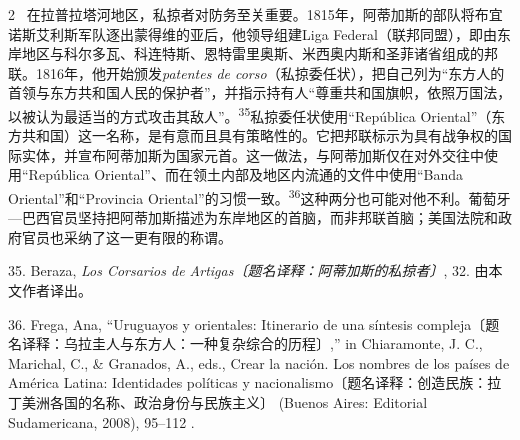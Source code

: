 \documentclass[10pt,a4paper]{article}
\begin{document}
\begin{paracol}{2}
\switchcolumn*
{\scriptsize\color{gray} [p. 9]}\ 在拉普拉塔河地区，私掠者对防务至关重要。1815年，阿蒂加斯的部队将布宜诺斯艾利斯军队逐出蒙得维的亚后，他领导组建Liga Federal（联邦同盟），即由东岸地区与科尔多瓦、科连特斯、恩特雷里奥斯、米西奥内斯和圣菲诸省组成的邦联。1816年，他开始颁发\textit{patentes de corso}（私掠委任状），把自己列为“东方人的首领与东方共和国人民的保护者”，并指示持有人“尊重共和国旗帜，依照万国法，以被认为最适当的方式攻击其敌人”。\nobreak\textsuperscript{35}私掠委任状使用“República Oriental”（东方共和国）这一名称，是有意而且具有策略性的。它把邦联标示为具有战争权的国际实体，并宣布阿蒂加斯为国家元首。这一做法，与阿蒂加斯仅在对外交往中使用“República Oriental”、而在领土内部及地区内流通的文件中使用“Banda Oriental”和“Provincia Oriental”的习惯一\mbox{致。\textsuperscript{36}}这种两分也可能对他不利。葡萄牙—巴西官员坚持把阿蒂加斯描述为东岸地区的首脑，而非邦联首脑；美国法院和政府官员也采纳了这一更有限的称谓。\par{\small 35. Beraza, \textit{Los Corsarios de Artigas〔题名译释：阿蒂加斯的私掠者〕}, 32. 由本文作者译出。\par}{\small 36. Frega, Ana, “Uruguayos y orientales: Itinerario de una síntesis compleja〔题名译释：乌拉圭人与东方人：一种复杂综合的历程〕,” in Chiaramonte, J. C., Marichal, C., \& Granados, A., eds., Crear la nación. Los nombres de los países de América Latina: Identidades políticas y nacionalismo〔题名译释：创造民族：拉丁美洲各国的名称、政治身份与民族主义〕 (Buenos Aires: Editorial Sudamericana, 2008), 95–112 .\par}
\switchcolumn

\end{paracol}
\end{document}

